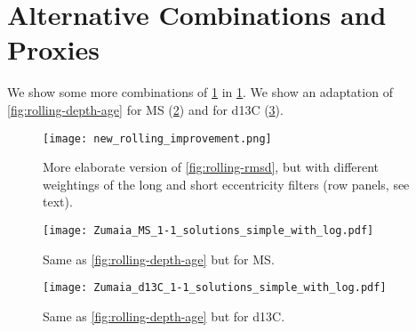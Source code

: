 \documentclass[draft]{agujournal2019}
\begin{document}
\section{Alternative Combinations and Proxies}

We show some more combinations of \cref{fig:rolling-rmsd-improvement} in \cref{fig:rolling-rmsd-improvement}.
We show an adaptation of \cref{fig:rolling-depth-age} for \gls{MS} (\cref{fig:rolling-age-MS}) and for \gls{d13C} (\cref{fig:rolling-age-d13C}).

\begin{figure}[htb]
  \centering \texttt{[image: new\_rolling\_improvement.png]}
  \caption{\label{fig:rolling-rmsd-improvement}
    More elaborate version of \cref{fig:rolling-rmsd}, but with different weightings of the long and short eccentricity filters (row panels, see text).}
\end{figure}


\begin{figure}[htb]
  \centering
  \texttt{[image: Zumaia\_MS\_1-1\_solutions\_simple\_with\_log.pdf]}
  \caption{\label{fig:rolling-age-MS}
    Same as \cref{fig:rolling-depth-age} but for \gls{MS}.}
\end{figure}

\begin{figure}[htb]
  \centering
  \texttt{[image: Zumaia\_d13C\_1-1\_solutions\_simple\_with\_log.pdf]}
  \caption{\label{fig:rolling-age-d13C}
    Same as \cref{fig:rolling-depth-age} but for \gls{d13C}.}
\end{figure}

%
%

%

%
\end{document}
